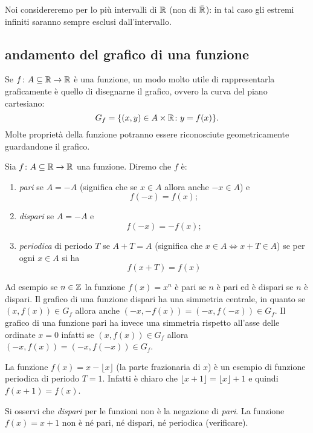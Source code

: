 Noi considereremo per lo più intervalli di ${\mathbb R}$ (non di $\bar {{\mathbb R}}$): in tal
caso gli estremi infiniti saranno sempre esclusi dall'intervallo.

\subsection{andamento del grafico di una funzione}
%
Se $f\colon A \subseteq {\mathbb R}\to {\mathbb R}$ è una funzione, un modo molto
utile di rappresentarla graficamente è quello di disegnarne il
grafico, ovvero la curva del piano cartesiano:
\[
   G_f = {\left\{ (x,y)\in A\times {\mathbb R}\colon y = f(x) \right\}}.
\]
Molte proprietà della funzione potranno essere riconosciute
geometricamente guardandone il grafico.

\begin{definition}[simmetrie]
Sia $f\colon A \subseteq {\mathbb R} \to {\mathbb R}$ una funzione.
Diremo che $f$ è:
\begin{enumerate}
\item \emph{pari}%
%
%
se $A=-A$ (significa che se $x\in A$ allora anche $-x\in A$) e
\[
  f(-x) = f(x);
\]
\item \emph{dispari}%
%
%
se $A=-A$ e
\[
  f(-x) = -f(x);
\]
\item \emph{periodica}%
%
%
di periodo $T$ se $A+T=A$
(significa che $x\in A \iff x+T \in A$)
se per ogni $x\in A$ si ha
\[
  f(x+T)=f(x)
\]
\end{enumerate}
\end{definition}

Ad esempio se $n\in {\mathbb Z}$ la funzione $f(x)=x^n$
è pari se $n$ è pari ed è dispari se $n$ è dispari.
Il grafico di una funzione dispari ha una simmetria
centrale, in quanto se $(x,f(x))\in G_f$ allora
anche $(-x,-f(x)) = (-x,f(-x))\in G_f$.
Il grafico di una funzione pari ha invece una
simmetria rispetto all'asse delle ordinate $x=0$
infatti se $(x,f(x))\in G_f$ allora $(-x,f(x)) = (-x,f(-x)) \in G_f$.

La funzione $f(x) = x - \lfloor x\rfloor$ (la parte frazionaria di $x$)
è un esempio di funzione periodica di periodo $T=1$. Infatti
è chiaro che $\lfloor x+1\rfloor = \lfloor x \rfloor +1$ e quindi
$f(x+1)=f(x)$.

Si osservi che \emph{dispari} per le funzioni non è la negazione
di \emph{pari}.
La funzione $f(x) = x+1$ non è né pari, né dispari, né periodica
(verificare).

